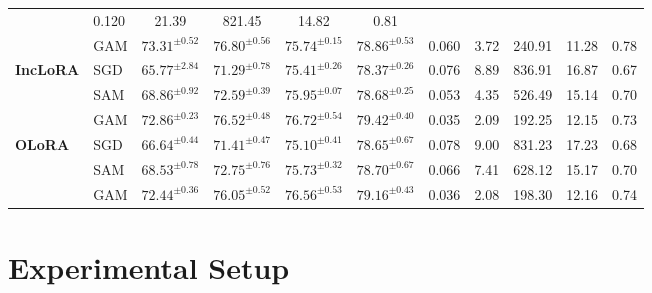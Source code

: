 \documentclass{article}
\theoremstyle{plain}
\theoremstyle{definition}
\theoremstyle{remark}
\begin{document}
\begin{table}[tph]
{\begin{tabular}{l l cccc ccc cc}
& 0.120 & 21.39                & 821.45
& 14.82 & 0.81 \\
& GAM
& $\mathbf{73.31}^{\pm 0.52}$ & \textbf{$\mathbf{76.80}^{\pm 0.56}$}
& $\mathbf{75.74}^{\pm 0.15}$ & \textbf{$\mathbf{78.86}^{\pm 0.53}$}
& 0.060 & 3.72                 & 240.91 
& 11.28 & 0.78 \\
\midrule
\multirow{3}{*}{\textbf{IncLoRA}}
& SGD
& $65.77^{\pm 2.84}$ & $71.29^{\pm 0.78}$
& $75.41^{\pm 0.26}$ & $78.37^{\pm 0.26}$
& 0.076 & 8.89                 & 836.91    
& 16.87 & 0.67 \\
& SAM
& $68.86^{\pm 0.92}$ & $72.59^{\pm 0.39}$
& $75.95^{\pm 0.07}$ & $78.68^{\pm 0.25}$
& 0.053 & 4.35                 & 526.49     
& 15.14 & 0.70 \\
& GAM
& $\mathbf{72.86}^{\pm 0.23}$ & $\mathbf{76.52}^{\pm 0.48}$
& $\mathbf{76.72}^{\pm 0.54}$ & $\mathbf{79.42}^{\pm 0.40}$ 
& 0.035 & 2.09                 & 192.25 
& 12.15 & 0.73 \\
\midrule
\multirow{3}{*}{\textbf{OLoRA}}
& SGD
& $66.64^{\pm 0.44}$ & $71.41^{\pm 0.47}$
& $75.10^{\pm 0.41}$ & $78.65^{\pm 0.67}$
& 0.078 & 9.00                 & 831.23
& 17.23 & 0.68 \\
& SAM
& $68.53^{\pm 0.78}$ & $72.75^{\pm 0.76}$
& $75.73^{\pm 0.32}$ & $78.70^{\pm 0.67}$
& 0.066 & 7.41                 & 628.12   
& 15.17 & 0.70 \\
& GAM
& $\mathbf{72.44}^{\pm 0.36}$ & $\mathbf{76.05}^{\pm 0.52}$
& $\mathbf{76.56}^{\pm 0.53}$ & $\mathbf{79.16}^{\pm 0.43}$
& 0.036& 2.08                 & 198.30  
& 12.16 & 0.74 \\
\bottomrule
\end{tabular}
}
\end{table}


\section{Experimental Setup}
\end{document}
